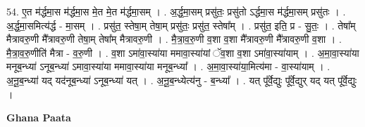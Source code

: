 \documentclass[17pt]{extarticle}
\begin{document}
54. ए॒त म॑र्द्धमा॒स म॑र्द्धमा॒स मे॒त मे॒त म॑र्द्धमा॒सम् । . अ॒र्द्ध॒मा॒सम् प्रसु॑तः॒ प्रसु॑तो ऽर्द्धमा॒स म॑र्द्धमा॒सम् प्रसु॑तः । . अ॒र्द्ध॒मा॒समित्य॑र्द्ध - मा॒सम् । . प्रसु॑त॒ स्तेषा॒म् तेषा॒म् प्रसु॑तः॒ प्रसु॑त॒ स्तेषा᳚म् । . प्रसु॑त॒ इति॒ प्र - सु॒तः॒ । . तेषा᳚म् मैत्रावरु॒णी मै᳚त्रावरु॒णी तेषा॒म् तेषा᳚म् मैत्रावरु॒णी । . मै॒त्रा॒व॒रु॒णी व॒शा व॒शा मै᳚त्रावरु॒णी मै᳚त्रावरु॒णी व॒शा । . मै॒त्रा॒व॒रु॒णीति॑ मैत्रा - व॒रु॒णी । . व॒शा ऽमा॑वा॒स्या॑या ममावा॒स्या॑यां ॅव॒शा व॒शा ऽमा॑वा॒स्या॑याम् । . अ॒मा॒वा॒स्या॑या मनूब॒न्ध्या॑ ऽनूब॒न्ध्या॑ ऽमावा॒स्या॑या ममावा॒स्या॑या मनूब॒न्ध्या᳚ । . अ॒मा॒वा॒स्या॑या॒मित्य॑मा - वा॒स्या॑याम् । . अ॒नू॒ब॒न्ध्या॑ यद् यद॑नूब॒न्ध्या॑ ऽनूब॒न्ध्या॑ यत् । . अ॒नू॒ब॒न्ध्येत्य॑नु - ब॒न्ध्या᳚ । . यत् पू᳚र्वे॒द्युः पू᳚र्वे॒द्युर् यद् यत् पू᳚र्वे॒द्युः । \newline

\textbf{Ghana Paata } \newline
\end{document}
